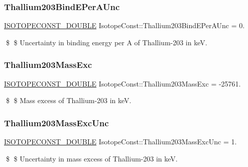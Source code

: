 \subsubsection{\texorpdfstring{Thallium203\+Bind\+E\+Per\+A\+Unc}{Thallium203BindEPerAUnc}}
{\footnotesize\ttfamily \mbox{\hyperlink{group___isotope_const-_macros_ga8f45a7272ce02c0b4c65c44636ed719a}{I\+S\+O\+T\+O\+P\+E\+C\+O\+N\+S\+T\+\_\+\+D\+O\+U\+B\+LE}} Isotope\+Const\+::\+Thallium203\+Bind\+E\+Per\+A\+Unc = 0.}

\$ \$ Uncertainty in binding energy per A of Thallium-\/203 in keV. \mbox{\label{group___isotope_const-_thallium-_tl203_gac053cbbdc702c026efa1816780618590}} 
\subsubsection{\texorpdfstring{Thallium203\+Mass\+Exc}{Thallium203MassExc}}
{\footnotesize\ttfamily \mbox{\hyperlink{group___isotope_const-_macros_ga8f45a7272ce02c0b4c65c44636ed719a}{I\+S\+O\+T\+O\+P\+E\+C\+O\+N\+S\+T\+\_\+\+D\+O\+U\+B\+LE}} Isotope\+Const\+::\+Thallium203\+Mass\+Exc = -\/25761.}

\$ \$ Mass excess of Thallium-\/203 in keV. \mbox{\label{group___isotope_const-_thallium-_tl203_gab43a740296b9b912b822f95210e0192b}} 
\subsubsection{\texorpdfstring{Thallium203\+Mass\+Exc\+Unc}{Thallium203MassExcUnc}}
{\footnotesize\ttfamily \mbox{\hyperlink{group___isotope_const-_macros_ga8f45a7272ce02c0b4c65c44636ed719a}{I\+S\+O\+T\+O\+P\+E\+C\+O\+N\+S\+T\+\_\+\+D\+O\+U\+B\+LE}} Isotope\+Const\+::\+Thallium203\+Mass\+Exc\+Unc = 1.}

\$ \$ Uncertainty in mass excess of Thallium-\/203 in keV. \mbox{\label{group___isotope_const-_thallium-_tl203_gaac0c28a99ed0772ca7ecfb454ee172ff}} 
